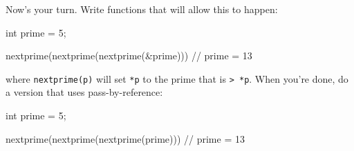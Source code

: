 Now's your turn. Write functions that will allow this to happen:



\begin{consolethree}[escapeinside=||]



int prime = 5;



nextprime(nextprime(nextprime(&prime))) // prime = 13

\end{consolethree}

where \texttt{nextprime(p)} will set \texttt{*p} to the prime that is \texttt{> *p}. When you're done, do a version that uses pass-by-reference:



\begin{consolethree}[escapeinside=||]

int prime = 5;



nextprime(nextprime(nextprime(prime))) // prime = 13

\end{consolethree}

